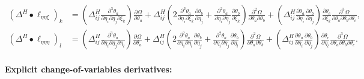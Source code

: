 \documentclass{article}
\begin{document}
%
\begin{align}
  (\Delta^H \bullet \ell_{\eta\eta\xi})_k   & = \left( \Delta^H_{ij} \tfrac{\partial^3 \theta_a}{\partial \eta_i \partial \eta_j \partial \xi_k} \right) \tfrac{\partial \Omega}{\partial \theta_a} + \Delta^H_{ij} \left( 2 \tfrac{\partial^2 \theta_a}{\partial \eta_i \partial \xi_k} \tfrac{\partial \theta_b}{\partial \eta_j} + \tfrac{\partial^2 \theta_a}{\partial \eta_i \partial \eta_j} \tfrac{\partial \theta_b}{\partial \xi_k} \right) \tfrac{\partial^2 \Omega}{\partial \theta_a \partial \theta_b} + \left( \Delta^H_{ij} \tfrac{\partial \theta_a}{\partial \eta_i} \tfrac{\partial \theta_b}{\partial \eta_j} \right) \tfrac{\partial \theta_c}{\partial \xi_k} \tfrac{\partial^3 \Omega}{\partial \theta_a \partial \theta_b \partial \theta_c}, \label{eq:third-derivative-ell-eta-eta-xi-delta-h}      \\
  (\Delta^H \bullet \ell_{\eta\eta\eta})_l  & = \left( \Delta^H_{ij} \tfrac{\partial^3 \theta_a}{\partial \eta_i \partial \eta_j \partial \eta_l} \right) \tfrac{\partial \Omega}{\partial \theta_a} + \Delta^H_{ij} \left( 2 \tfrac{\partial^2 \theta_a}{\partial \eta_i \partial \eta_l} \tfrac{\partial \theta_b}{\partial \eta_j} + \tfrac{\partial^2 \theta_a}{\partial \eta_i \partial \eta_j} \tfrac{\partial \theta_b}{\partial \eta_l} \right) \tfrac{\partial^2 \Omega}{\partial \theta_a \partial \theta_b} + \left( \Delta^H_{ij} \tfrac{\partial \theta_a}{\partial \eta_i} \tfrac{\partial \theta_b}{\partial \eta_j} \right) \tfrac{\partial \theta_c}{\partial \eta_l} \tfrac{\partial^3 \Omega}{\partial \theta_a \partial \theta_b \partial \theta_c}. \label{eq:third-derivative-ell-eta-eta-eta-delta-h}
\end{align}

\paragraph{Explicit change-of-variables derivatives:}
\end{document}
